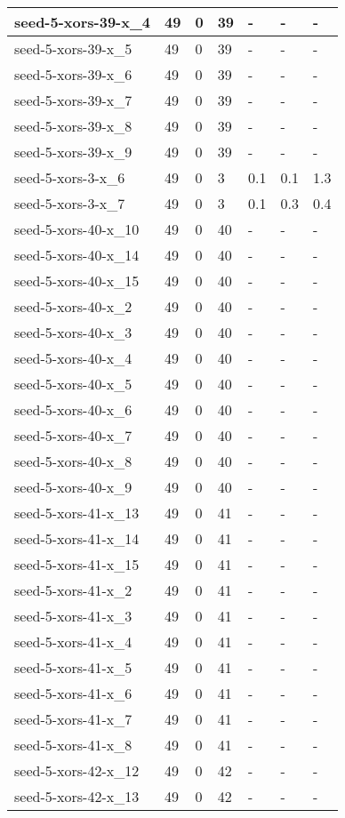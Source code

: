 \begin{scriptsize}
\begin{longtable}{|p{5cm}|l|l|l|l|l|l|}
seed-5-xors-39-x\_4&49&0&39&-&-&- \\ \hline 
seed-5-xors-39-x\_5&49&0&39&-&-&- \\ \hline 
seed-5-xors-39-x\_6&49&0&39&-&-&- \\ \hline 
seed-5-xors-39-x\_7&49&0&39&-&-&- \\ \hline 
seed-5-xors-39-x\_8&49&0&39&-&-&- \\ \hline 
seed-5-xors-39-x\_9&49&0&39&-&-&- \\ \hline 
seed-5-xors-3-x\_6&49&0&3&0.1&0.1&1.3 \\ \hline 
seed-5-xors-3-x\_7&49&0&3&0.1&0.3&0.4 \\ \hline 
seed-5-xors-40-x\_10&49&0&40&-&-&- \\ \hline 
seed-5-xors-40-x\_14&49&0&40&-&-&- \\ \hline 
seed-5-xors-40-x\_15&49&0&40&-&-&- \\ \hline 
seed-5-xors-40-x\_2&49&0&40&-&-&- \\ \hline 
seed-5-xors-40-x\_3&49&0&40&-&-&- \\ \hline 
seed-5-xors-40-x\_4&49&0&40&-&-&- \\ \hline 
seed-5-xors-40-x\_5&49&0&40&-&-&- \\ \hline 
seed-5-xors-40-x\_6&49&0&40&-&-&- \\ \hline 
seed-5-xors-40-x\_7&49&0&40&-&-&- \\ \hline 
seed-5-xors-40-x\_8&49&0&40&-&-&- \\ \hline 
seed-5-xors-40-x\_9&49&0&40&-&-&- \\ \hline 
seed-5-xors-41-x\_13&49&0&41&-&-&- \\ \hline 
seed-5-xors-41-x\_14&49&0&41&-&-&- \\ \hline 
seed-5-xors-41-x\_15&49&0&41&-&-&- \\ \hline 
seed-5-xors-41-x\_2&49&0&41&-&-&- \\ \hline 
seed-5-xors-41-x\_3&49&0&41&-&-&- \\ \hline 
seed-5-xors-41-x\_4&49&0&41&-&-&- \\ \hline 
seed-5-xors-41-x\_5&49&0&41&-&-&- \\ \hline 
seed-5-xors-41-x\_6&49&0&41&-&-&- \\ \hline 
seed-5-xors-41-x\_7&49&0&41&-&-&- \\ \hline 
seed-5-xors-41-x\_8&49&0&41&-&-&- \\ \hline 
seed-5-xors-42-x\_12&49&0&42&-&-&- \\ \hline 
seed-5-xors-42-x\_13&49&0&42&-&-&- \\ \hline 

\end{longtable}
\end{scriptsize}
